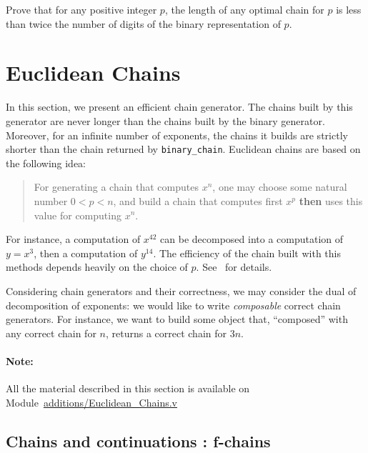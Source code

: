 \begin{exercise}
Prove that for any positive integer $p$,  the length of any optimal chain 
for $p$ is less  than twice the number of digits of the binary representation of $p$.
\end{exercise}







\section{Euclidean Chains}
\label{euclide-sect}
In this section, we present an efficient chain generator. The chains built by this generator
are never longer than the chains built by the binary generator. Moreover, for an 
infinite number of exponents, the chains it builds are strictly shorter than the chain
returned by \texttt{binary\_chain}. 
Euclidean chains are based on the following idea: 
\begin{quote}
For generating a chain that computes $x^n$, one may choose some natural number
$0<p<n$, and build a chain that computes first $x^p$ \textbf{then} uses this value
for computing $x^n$. 
\end{quote}

For instance, a  computation of $x^{42}$ can be decomposed into a computation 
of $y=x^3$, then a computation of $y^{14}$. The efficiency of the chain built with this
methods depends heavily on the choice of $p$. See~\cite{DBLP:journals/ita/BrlekCHM95} for details.

Considering chain generators and their correctness, we may consider the dual of 
decomposition of exponents: we would like to write \emph{composable} correct 
chain generators. For instance, we want to build some object that, ``composed''  
with any correct chain for $n$, returns a correct chain for $3n$.

\paragraph{Note:}
All the \coq{} material described in this section is available on 
 Module~\href{../theories/html/additions.Euclidean_Chains.html}{additions/Euclidean\_Chains.v}

\subsection{Chains and continuations : f-chains}


